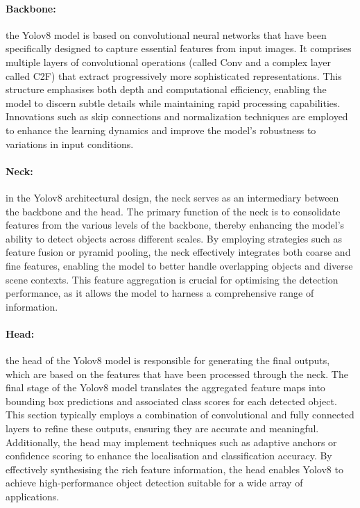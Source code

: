 \paragraph{Backbone:}\label{par:backbone}
the Yolov8 model is based on convolutional neural networks that have been specifically designed to capture essential features from input images.
It comprises multiple layers of convolutional operations (called Conv and a complex layer called C2F)
that extract progressively more sophisticated representations.
This structure emphasises both depth and computational efficiency,
enabling the model to discern subtle details while maintaining rapid processing capabilities.
Innovations such as skip connections and normalization techniques are employed to enhance the learning dynamics and improve the model's robustness to variations in input conditions.

\paragraph{Neck:}\label{par:neck}
in the Yolov8 architectural design, the neck serves as an intermediary between the backbone and the head.
The primary function of the neck is to consolidate features from the various levels of the backbone,
thereby enhancing the model's ability to detect objects across different scales.
By employing strategies such as feature fusion or pyramid pooling,
the neck effectively integrates both coarse and fine features,
enabling the model to better handle overlapping objects and diverse scene contexts.
This feature aggregation is crucial for optimising the detection performance,
as it allows the model to harness a comprehensive range of information.



\paragraph{Head:}\label{par:head}
the head of the Yolov8 model is responsible for generating the final outputs,
which are based on the features that have been processed through the neck.
The final stage of the Yolov8 model translates the aggregated feature maps into bounding box predictions and associated class scores for each detected object.
This section typically employs a combination of convolutional and fully connected layers to refine these outputs,
ensuring they are accurate and meaningful.
Additionally, the head may implement techniques such as adaptive anchors or
confidence scoring to enhance the localisation and classification accuracy.
By effectively synthesising the rich feature information, the head enables Yolov8 to achieve high-performance object detection suitable for a wide array of applications.

